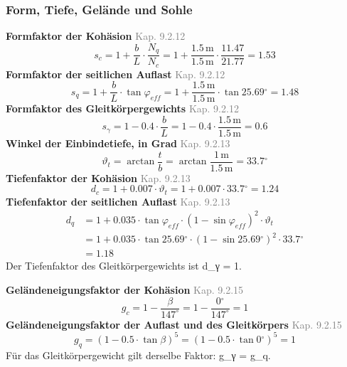 \documentclass[11pt,a4paper]{article}
\newcommand{\normref}[1]{{\small\textcolor{gray}{#1}}}
\begin{document}
\subsubsection{Form, Tiefe, Gelände und Sohle}
\noindent\textbf{Formfaktor der Kohäsion} \hfill \normref{Kap. 9.2.12}
\begin{equation*}
s_c = 1 + \frac{b}{L} \cdot \frac{N_q}{N_c} = 1 + \frac{1.5\,\mathrm{m}}{1.5\,\mathrm{m}} \cdot \frac{11.47}{21.77} = 1.53
\end{equation*}
\noindent\textbf{Formfaktor der seitlichen Auflast} \hfill \normref{Kap. 9.2.12}
\begin{equation*}
s_q = 1 + \frac{b}{L} \cdot \tan \varphi_{eff} = 1 + \frac{1.5\,\mathrm{m}}{1.5\,\mathrm{m}} \cdot \tan 25.69{}^{\circ} = 1.48
\end{equation*}
\noindent\textbf{Formfaktor des Gleitkörpergewichts} \hfill \normref{Kap. 9.2.12}
\begin{equation*}
s_{\gamma} = 1 - 0.4 \cdot \frac{b}{L} = 1 - 0.4 \cdot \frac{1.5\,\mathrm{m}}{1.5\,\mathrm{m}} = 0.6
\end{equation*}
\noindent\textbf{Winkel der Einbindetiefe, in Grad} \hfill \normref{Kap. 9.2.13}
\begin{equation*}
\vartheta_t = \arctan\frac{t}{b} = \arctan\frac{1\,\mathrm{m}}{1.5\,\mathrm{m}} = 33.7{}^{\circ}
\end{equation*}
\noindent\textbf{Tiefenfaktor der Kohäsion} \hfill \normref{Kap. 9.2.13}
\begin{equation*}
d_c = 1 + 0.007 \cdot \vartheta_t = 1 + 0.007 \cdot 33.7{}^{\circ} = 1.24
\end{equation*}
\noindent\textbf{Tiefenfaktor der seitlichen Auflast} \hfill \normref{Kap. 9.2.13}
\begin{equation*}
\begin{aligned}
  d_q &= 1 + 0.035 \cdot \tan \varphi_{eff} \cdot \left(1 - \sin \varphi_{eff}\right)^{2} \cdot \vartheta_t \\
  &= 1 + 0.035 \cdot \tan 25.69{}^{\circ} \cdot \left(1 - \sin 25.69{}^{\circ}\right)^{2} \cdot 33.7{}^{\circ} \\
  &= 1.18
\end{aligned}
\end{equation*}
Der Tiefenfaktor des Gleitkörpergewichts ist d\_γ = 1.

\noindent\textbf{Geländeneigungsfaktor der Kohäsion} \hfill \normref{Kap. 9.2.15}
\begin{equation*}
g_c = 1 - \frac{\beta}{147^\circ} = 1 - \frac{0{}^{\circ}}{147^\circ} = 1
\end{equation*}
\noindent\textbf{Geländeneigungsfaktor der Auflast und des Gleitkörpers} \hfill \normref{Kap. 9.2.15}
\begin{equation*}
g_q = \left(1 - 0.5 \cdot \tan \beta\right)^{5} = \left(1 - 0.5 \cdot \tan 0{}^{\circ}\right)^{5} = 1
\end{equation*}
Für das Gleitkörpergewicht gilt derselbe Faktor: g\_γ = g\_q.
\end{document}

